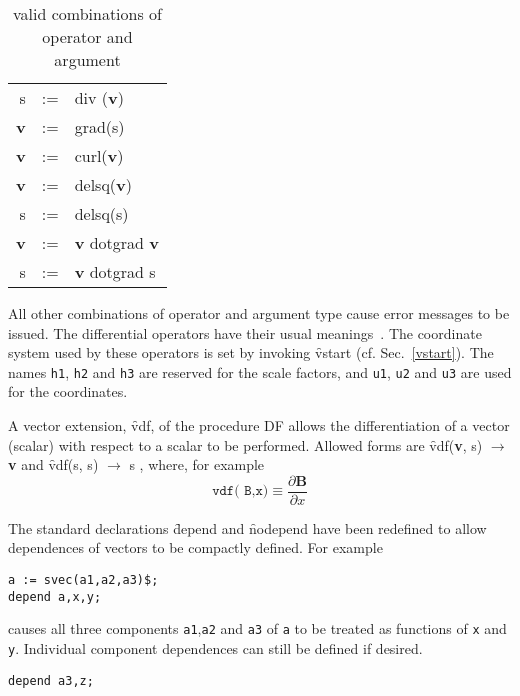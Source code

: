 \begin{table}[!tbp]
\begin{center}
\begin{tabular}{rcl}
s & := & div (\textbf{v})  \\
\textbf{v} & := & grad(s) \\
\textbf{v} & := & curl(\textbf{v})  \\
\textbf{v} & := & delsq(\textbf{v}) \\
 s  & := & delsq(s) \\
\textbf{v} & := & \textbf{v}  dotgrad \textbf{v}  \\
 s & := & \textbf{v}  dotgrad  s
\end{tabular}
\end{center}
\caption{ valid combinations of operator and argument}\label{vvecttable}
\end{table}

All other combinations of operator and argument type cause error
messages to be issued.  The differential operators have their usual
meanings~\cite{Spiegel:59}.  The coordinate system used by these operators is
set by invoking  \f{vstart} (cf. Sec.~\ref{vstart}).  The names \texttt{h1},
\texttt{h2}  and \texttt{h3} are
reserved for the scale factors, and \texttt{u1}, \texttt{u2} and \texttt{u3} are
used for the coordinates.

A vector extension, \f{vdf}, of the \REDUCE procedure DF allows the
differentiation of a vector (scalar) with respect to a scalar to be
performed.  Allowed forms are 
\hypertarget{operator:VDF}{}
\f{vdf}(\textbf{v}, s)  $\rightarrow$  \textbf{v}   and
\f{vdf}(s, s)  $\rightarrow$   s ,
where, for example
\begin{equation*}
\texttt{vdf( B,x)} \equiv \frac{\partial \textbf{B}}{\partial x}
\end{equation*}

The standard \REDUCE declarations \f{depend} and \f{nodepend} have been redefined
to allow dependences of vectors to be compactly
defined.  For example 
\begin{verbatim}
a := svec(a1,a2,a3)$;
depend a,x,y;
\end{verbatim}
causes all three components \texttt{a1},\texttt{a2} and \texttt{a3} of \texttt{a}
to be treated as functions of \texttt{x} and \texttt{y}.
Individual component dependences can still be defined if desired.
\begin{verbatim}
depend a3,z;
\end{verbatim}

